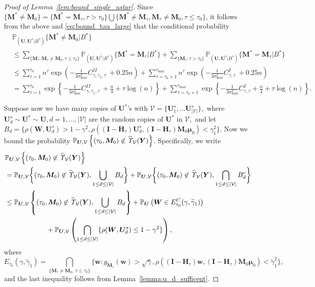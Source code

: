 \documentclass[12pt]{article}
\theoremstyle{shortspace}
\def\*#1{\bm{#1}}
\def\P{\mathbb P}
\begin{document}
\begin{proof}[Proof of Lemma~\ref{lem:bound_single_ustar}]
Since $\{\*M^* \neq \*M_0\} =  \{\*M^* = \*M_\tau, \tau > \tau_0\}  \bigcup \{\*M^* \neq \*M_\tau, \*M_\tau \neq \*M_0, \tau \leq \tau_0\}$, it follows from the above and 
\eqref{eq:bound_tau_large}  that the conditional probability
\begin{align}\label{eq:aaa_1}
& \P_{(\*U, \*U^*|B^*)}\bigg\{{\*M}^* \neq \*M_0 \bigg|B^* \bigg\} \nonumber \\ 
& \leq \sum_{\{\*M_\tau: \*M_\tau \neq \*M_0, \tau \leq \tau_0\}}\P_{(\*U, \*U^*|B^*)}\bigg\{{\*M}^* = \*M_\tau \bigg| B^* \bigg\}\nonumber +  \sum_{\{\*M_\tau:  \tau > \tau_0\}}\P_{(\*U, \*U^*|B^*)}\bigg\{{\*M}^* = \*M_\tau \bigg |B^* \bigg\} \nonumber \\ 
&  \leq  \sum_{\tau=1}^{\tau_0} n^{\tau} \exp\left(-\frac{1}{3\sigma^2_{\max}}C^{II}_{\gamma, \gamma_1, \tau}\ + 0.25n \right) +  \sum_{\tau=\tau_0 + 1}^{\tau_{\max}} n^{\tau} \exp\left(-\frac{1}{3\sigma^2_{\max}}C^{I}_{\gamma,  \tau}\ + 0.25n \right) \nonumber\\
    & =  \sum_{\tau=1}^{\tau_0} \exp\left\{-\frac{1}{3\sigma^2_{\max}} C^{II}_{\gamma, \gamma_1, \tau}\ + \frac{n}4 + \tau\log(n)\right\} + \sum^{\tau_{\max}}_{\tau=\tau_0+1}
    \exp\left\{-\frac{1}{3\sigma^2_{\max}} C^I_{\gamma, \tau} + \frac{n}4 +  \tau\log(n) \right\}.
\end{align}

Suppose now we have many copies of $\*U^*$'s with
$\mathcal V   = \{\*U^s_1, \dots \*U^s_{|\mathcal V|}\},$ where $\*U^s_d \sim \*U^* \sim \*U, d= 1, \dots, |\mathcal V|$ are the random copies of $\*U^*$ in $\mathcal V,$ and let $B_d =  \bigg\{\rho(\*W, \*U^s_d) > 1-\gamma^2, \rho((\*I - \*H_\tau)\*U^s_d, (\*I - \*H_\tau)\*M_0\*\mu_0)<  \gamma_1^2\bigg\}.$ 
Now we bound the probability $\P_{\*U,\mathcal V  }\left\{(\tau_0, \*M_0) \not\in \widehat{\it \Upsilon}_{{\mathcal V}}(\*Y)\right\} $. Specifically, we  write
\begin{align} 
\label{eq:total_bound}
    &  \P_{\*U,\mathcal V  }\left\{(\tau_0, \*M_0) \not\in \widehat{\it \Upsilon}_{{\mathcal V}}(\*Y)\right\} \nonumber \\ & =  \P_{\*U,\mathcal V  }\bigg\{(\tau_0, \*M_0) \not\in \widehat{\it \Upsilon}_{{\mathcal V}}(\*Y), \bigcup_{1 \leq d \leq |\mathcal V|} B_d\bigg\}  +   \P_{\*U,\mathcal V  }\bigg\{(\tau_0, \*M_0) \not\in \widehat{\it \Upsilon}_{{\mathcal V}}(\*Y), \bigcap_{1 \leq d \leq |\mathcal V|}B_d^c \bigg\} \nonumber \\
    &  \leq \P_{\*U,\mathcal V  }\left\{(\tau_0, \*M_0) \not\in \widehat{\it \Upsilon}_{{\mathcal V}}(\*Y), \bigcup_{1 \leq d \leq |\mathcal V|}B_d\right\} + \P_{\*U}\left(\*W \in E^C_{\tau_0}(\gamma, \widetilde \gamma_1)\right) \nonumber \\ & \qquad  \qquad \qquad +  \P_{\*U,\mathcal V} \left(\bigcap_{1 \leq d \leq |\mathcal V|}\{\rho(\*W,\*U^s_d) \leq 1 - \gamma^2 \}\right),
\end{align}
where $$E_{\tau_0}(\gamma,\widetilde\gamma_1 ) = \bigcap_{\{\*M_\tau \neq \*M_0, \, \tau \leq \tau_0\}}\{\*w: g_{\*M_\tau}(\*w) > \sqrt{\gamma}, \rho((\*I - \*H_\tau)\*w, (\*I - \*H_\tau)\*M_0\*\mu_0)< \widetilde \gamma_1^2\},$$
and the last inequality follows from Lemma~\ref{lemma:u_d_sufficent}.



\end{proof}
\end{document}
